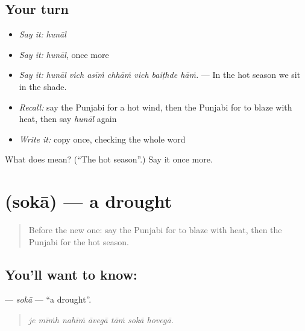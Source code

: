 \subsection*{Your turn}
\begin{itemize}
\raggedright
  \item \emph{Say it:} \emph{hunāl}
  \item \emph{Say it:} \emph{hunāl}, once more
  \item \emph{Say it:} \emph{hunāl vich asīṁ chhāṁ vich baiṭhde hāṁ.} — In the hot season we sit in the shade.
  \item \emph{Recall:} say the Punjabi for a hot wind, then the Punjabi for to blaze with heat, then say \emph{hunāl} again
  \item \emph{Write it:} copy \textbf{} once, checking the whole word
\end{itemize}

\begin{tcolorbox}[breakable,colback=teal!4,colframe=teal!35!black,title={Before you move on}]
What does  mean? (\textquotedblleft{}The hot season\textquotedblright{}.) Say it once more.
\end{tcolorbox}
\section[\texorpdfstring{\pa{ਸੋਕਾ} (sokā)}{ਸੋਕਾ (sokā)}]{ (sokā) — a drought}

\label{lesson:PA-C288-soka}



\begin{quote}
Before the new one: say the Punjabi for to blaze with heat, then the Punjabi for the hot season.
\end{quote}

\subsection*{You'll want to know: }
\textbf{} — \emph{sokā} — \textquotedblleft{}a drought\textquotedblright{}.

\begin{quote}
      
\end{quote}

\begin{quote}
\emph{je mīṁh nahīṁ āvegā tāṁ sokā hovegā.}
\end{quote}


